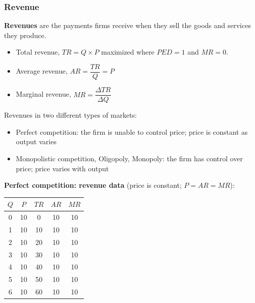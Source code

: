 \documentclass[a4paper,12pt]{article}
\newcommand{\needbold}[1]{\textcolor{red!70!black}{\textbf{#1}}}
\begin{document}
\subsubsection*{Revenue}
\needbold{Revenues} are the payments firms receive when they sell the goods and services they produce. 
\begin{itemize}
  \item Total revenue, $TR=Q\times P$ maximized where $PED = 1$ and $MR = 0$.
  \item Average revenue, $AR=\dfrac{TR}{Q}=P$ 
  \item Marginal revenue, $MR=\dfrac{\Delta TR}{\Delta Q}$
\end{itemize}
Revenues in two different types of markets:
\begin{itemize}
  \item Perfect competition: the firm is unable to control price; price is constant as output varies
  \item Monopolistic competition, Oligopoly, Monopoly: the firm has control over price; price varies with output
\end{itemize}
\textbf{Perfect competition: revenue data} (price is constant; $P = AR = MR$):
\begin{center}
\begin{tabular}{ccccc}
\toprule
$Q$ & $P$ & $TR$ & $AR$ & $MR$ \\
\midrule
0 & 10 & 0  & 10 & 10 \\
1 & 10 & 10 & 10 & 10 \\
2 & 10 & 20 & 10 & 10 \\
3 & 10 & 30 & 10 & 10 \\
4 & 10 & 40 & 10 & 10 \\
5 & 10 & 50 & 10 & 10 \\
6 & 10 & 60 & 10 & 10 \\
\bottomrule
\end{tabular}
\end{center}
\begin{center}
\end{center}
\end{document}
